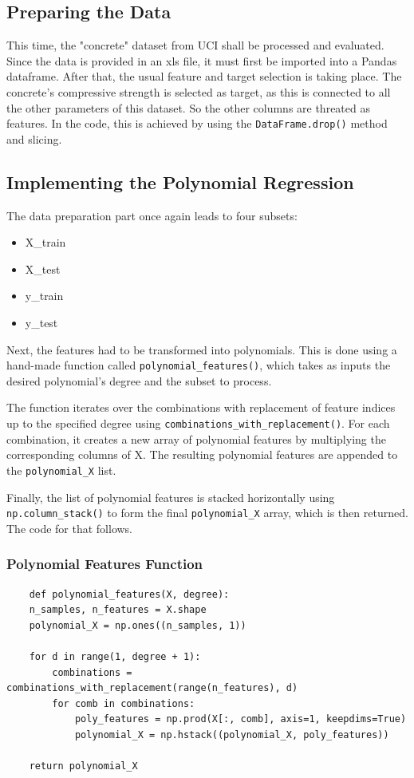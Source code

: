 \documentclass{CPSReport}
\begin{document}
\subsection{Preparing the Data}
This time, the "concrete" dataset from UCI shall be processed and evaluated. Since the data is provided in an xls file, it must first be imported into a Pandas dataframe. After that, the usual feature and target selection is taking place. The concrete's compressive strength is selected as target, as this is connected to all the other parameters of this dataset. So the other columns are threated as features. In the code, this is achieved by using the \texttt{DataFrame.drop()} method and slicing.

\subsection{Implementing the Polynomial Regression}
The data preparation part once again leads to four subsets:
\begin{itemize}
    \item X\_train
    \item X\_test
    \item y\_train
    \item y\_test
\end{itemize}

Next, the features had to be transformed into polynomials. This is done using a hand-made function called \texttt{polynomial_features()}, which takes as inputs the desired polynomial's degree and the subset to process.

The function iterates over the combinations with replacement of feature indices up to the specified degree using \texttt{combinations_with_replacement()}. For each combination, it creates a new array of polynomial features by multiplying the corresponding columns of X. The resulting polynomial features are appended to the \texttt{polynomial_X} list.

Finally, the list of polynomial features is stacked horizontally using \texttt{np.column_stack()} to form the final \texttt{polynomial_X} array, which is then returned. The code for that follows.

\subsubsection{Polynomial Features Function}
\begin{verbatim}
    def polynomial_features(X, degree):
    n_samples, n_features = X.shape
    polynomial_X = np.ones((n_samples, 1))

    for d in range(1, degree + 1):
        combinations = combinations_with_replacement(range(n_features), d)
        for comb in combinations:
            poly_features = np.prod(X[:, comb], axis=1, keepdims=True)
            polynomial_X = np.hstack((polynomial_X, poly_features))

    return polynomial_X
\end{verbatim}
\end{document}
